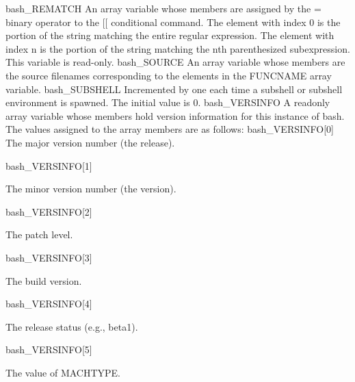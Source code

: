 \documentclass[11pt]{article}
\begin{document}
$$bash\_REMATCH
An array variable whose members are assigned by the =~ binary operator to the [[ conditional command. The element with index 0 is the portion of the string matching the entire regular expression. The element with index n is the portion of the string matching the nth parenthesized subexpression. This variable is read-only.
bash\_SOURCE
An array variable whose members are the source filenames corresponding to the elements in the FUNCNAME array variable.
bash\_SUBSHELL
Incremented by one each time a subshell or subshell environment is spawned. The initial value is 0.
bash\_VERSINFO
A readonly array variable whose members hold version information for this instance of bash. The values assigned to the array members are as follows:
bash\_VERSINFO[0]
The major version number (the release).

bash\_VERSINFO[1]

The minor version number (the version).

bash\_VERSINFO[2]

The patch level.

bash\_VERSINFO[3]

The build version.

bash\_VERSINFO[4]

The release status (e.g., beta1).

bash\_VERSINFO[5]

The value of MACHTYPE.
\end{document}
